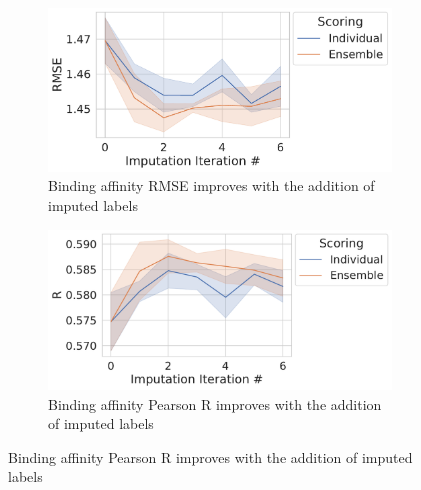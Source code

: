 \documentclass[journal=jmcmar,manuscript=article]{achemso}
\begin{document}
\begin{figure}[tbph]
    \centering
    \begin{subfigure}[t]{0.48\textwidth}
        \centering
        \includegraphics[width=\linewidth]{figures/InitialImpRMSE.pdf}
        \caption{Binding affinity RMSE improves with the addition of imputed labels}
    \end{subfigure}
    \hfill
    \begin{subfigure}[t]{0.48\textwidth}
        \centering
        \includegraphics[width=\linewidth]{figures/InitialImpR.pdf}
        \caption{Binding affinity Pearson R improves with the addition of imputed labels}
    \end{subfigure}


\end{figure}
\end{document}
